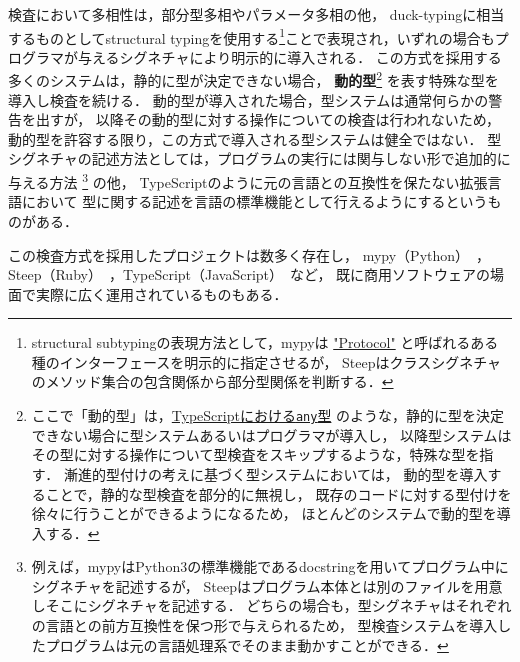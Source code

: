 検査において多相性は，部分型多相やパラメータ多相の他，
duck-typingに相当するものとしてstructural typingを使用する\footnote{
  structural subtypingの表現方法として，mypyは
  \href{https://mypy.readthedocs.io/en/latest/protocols.html\#protocols-and-structural-subtyping}{"Protocol"}
  と呼ばれるある種のインターフェースを明示的に指定させるが，
  Steepはクラスシグネチャのメソッド集合の包含関係から部分型関係を判断する．%
}ことで表現され，いずれの場合もプログラマが与えるシグネチャにより明示的に導入される．
この方式を採用する多くのシステムは，静的に型が決定できない場合，
\textbf{動的型}\footnote{
  ここで「動的型」は，\href{https://www.typescriptlang.org/docs/handbook/basic-types.html\#any}{TypeScriptにおける\texttt{any}型}
  のような，静的に型を決定できない場合に型システムあるいはプログラマが導入し，
  以降型システムはその型に対する操作について型検査をスキップするような，特殊な型を指す．
  漸進的型付けの考えに基づく型システムにおいては，
  動的型を導入することで，静的な型検査を部分的に無視し，
  既存のコードに対する型付けを徐々に行うことができるようになるため，
  ほとんどのシステムで動的型を導入する．
} を表す特殊な型を導入し検査を続ける．
動的型が導入された場合，型システムは通常何らかの警告を出すが，
以降その動的型に対する操作についての検査は行われないため，
動的型を許容する限り，この方式で導入される型システムは健全ではない．
型シグネチャの記述方法としては，プログラムの実行には関与しない形で追加的に与える方法
\footnote{
  例えば，mypyはPython3の標準機能であるdocstringを用いてプログラム中にシグネチャを記述するが，
  Steepはプログラム本体とは別のファイルを用意しそこにシグネチャを記述する．
  どちらの場合も，型シグネチャはそれぞれの言語との前方互換性を保つ形で与えられるため，
  型検査システムを導入したプログラムは元の言語処理系でそのまま動かすことができる．
} の他，
TypeScriptのように元の言語との互換性を保たない拡張言語において
型に関する記述を言語の標準機能として行えるようにするというものがある．

この検査方式を採用したプロジェクトは数多く存在し，
mypy（Python）~\cite{mypy}，Steep（Ruby）~\cite{steep}，TypeScript（JavaScript）~\cite{typescript}など，
既に商用ソフトウェアの場面で実際に広く運用されているものもある．

